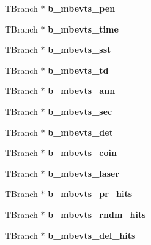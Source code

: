 \begin{DoxyCompactItemize}
T\+Branch $\ast$ {\bfseries b\+\_\+mbevts\+\_\+pen}
\item 
\mbox{\label{classg__clx_ac43ee47414821ea7c50597d2539baefe}} 
T\+Branch $\ast$ {\bfseries b\+\_\+mbevts\+\_\+time}
\item 
\mbox{\label{classg__clx_a0788c96ddf563f127b260ad2d259ef80}} 
T\+Branch $\ast$ {\bfseries b\+\_\+mbevts\+\_\+sst}
\item 
\mbox{\label{classg__clx_a9b39386d9c1a2e6536fa62a70d2d169f}} 
T\+Branch $\ast$ {\bfseries b\+\_\+mbevts\+\_\+td}
\item 
\mbox{\label{classg__clx_ac6b131947020f22150d9562d519bce3f}} 
T\+Branch $\ast$ {\bfseries b\+\_\+mbevts\+\_\+ann}
\item 
\mbox{\label{classg__clx_a626c3570226a2cf9bdb2b523f1422286}} 
T\+Branch $\ast$ {\bfseries b\+\_\+mbevts\+\_\+sec}
\item 
\mbox{\label{classg__clx_a682289b20e95b369adcdf382225884a2}} 
T\+Branch $\ast$ {\bfseries b\+\_\+mbevts\+\_\+det}
\item 
\mbox{\label{classg__clx_a6f09892a8e1906c10e7f2575d41641bf}} 
T\+Branch $\ast$ {\bfseries b\+\_\+mbevts\+\_\+coin}
\item 
\mbox{\label{classg__clx_a34c3cf461751e39034565bfb9dad5a7d}} 
T\+Branch $\ast$ {\bfseries b\+\_\+mbevts\+\_\+laser}
\item 
\mbox{\label{classg__clx_a65da8db31fa55fae0873a2e67a862bf7}} 
T\+Branch $\ast$ {\bfseries b\+\_\+mbevts\+\_\+pr\+\_\+hits}
\item 
\mbox{\label{classg__clx_a4c476be1f0e3227fce3ad74f91224929}} 
T\+Branch $\ast$ {\bfseries b\+\_\+mbevts\+\_\+rndm\+\_\+hits}
\item 
\mbox{\label{classg__clx_af8844a7d126f13b0932cf3d3ecce107b}} 
T\+Branch $\ast$ {\bfseries b\+\_\+mbevts\+\_\+del\+\_\+hits}
\item 
\mbox{\label{classg__clx_a249297b5ba9a24c75c59f6055e9fe061}} 

\end{DoxyCompactItemize}
